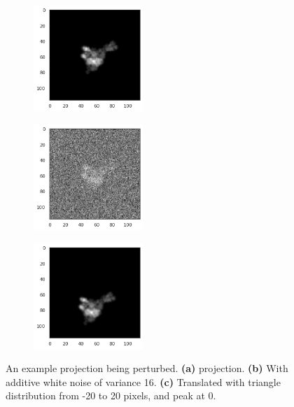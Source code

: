 \begin{figure}[ht!]
    \centering
    \begin{subfigure}[b]{0.3\textwidth}
        \includegraphics[height=4cm]{images/5j0n_noise0.png}
        \caption{}
    \end{subfigure}
    \hfill
    \begin{subfigure}[b]{0.3\textwidth}
    \centering
        \includegraphics[height=4cm]{images/5j0n_noise16.png}
        \caption{}
    \end{subfigure}
    \hfill
    \begin{subfigure}[b]{0.3\textwidth}
    \centering
        \includegraphics[height=4cm]{images/5j0n_translated.png}
        \caption{}
    \end{subfigure}
    \caption{An example projection being perturbed.
    \textbf{(a)}  projection.
    \textbf{(b)} With additive white noise of variance 16.
    \textbf{(c)} Translated with triangle distribution from -20 to 20 pixels, and peak at 0.}
    \label{fig:different-projections}
\end{figure}

